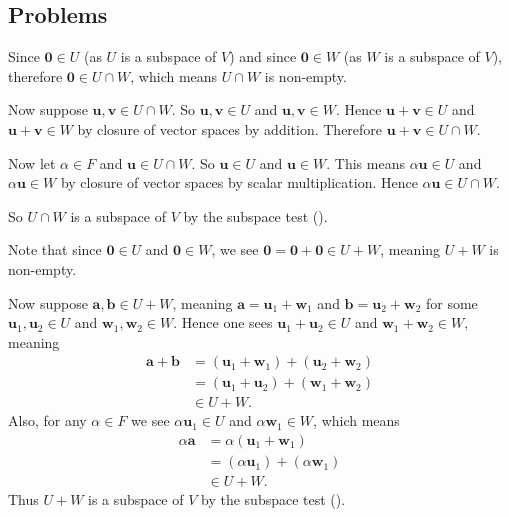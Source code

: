 \subsection*{Problems}
\begin{questions}
    \item \begin{partquestions}{\alph*}
        \item Since $\mathbf{0} \in U$ (as $U$ is a subspace of $V$) and since $\mathbf{0} \in W$ (as $W$ is a subspace of $V$), therefore $\mathbf{0} \in U \cap W$, which means $U \cap W$ is non-empty.

        Now suppose $\mathbf{u}, \mathbf{v} \in U \cap W$. So $\mathbf{u}, \mathbf{v} \in U$ and $\mathbf{u}, \mathbf{v} \in W$. Hence $\mathbf{u} + \mathbf{v} \in U$ and $\mathbf{u} + \mathbf{v} \in W$ by closure of vector spaces by addition. Therefore $\mathbf{u} + \mathbf{v} \in U \cap W$.

        Now let $\alpha \in F$ and $\mathbf{u} \in U \cap W$. So $\mathbf{u} \in U$ and $\mathbf{u} \in W$. This means $\alpha\mathbf{u} \in U$ and $\alpha\mathbf{u} \in W$ by closure of vector spaces by scalar multiplication. Hence $\alpha\mathbf{u} \in U \cap W$.

        So $U \cap W$ is a subspace of $V$ by the subspace test ().

        \item Note that since $\mathbf{0} \in U$ and $\mathbf{0} \in W$, we see $\mathbf{0} = \mathbf{0} + \mathbf{0} \in U + W$, meaning $U + W$ is non-empty.

        Now suppose $\mathbf{a}, \mathbf{b} \in U + W$, meaning $\mathbf{a} = \mathbf{u}_1 + \mathbf{w}_1$ and $\mathbf{b} = \mathbf{u}_2 + \mathbf{w}_2$ for some $\mathbf{u}_1, \mathbf{u}_2 \in U$ and $\mathbf{w}_1, \mathbf{w}_2 \in W$. Hence one sees $\mathbf{u}_1 + \mathbf{u}_2 \in U$ and $\mathbf{w}_1 + \mathbf{w}_2 \in W$, meaning
        \begin{align*}
            \mathbf{a} + \mathbf{b} &= (\mathbf{u}_1 + \mathbf{w}_1) + (\mathbf{u}_2 + \mathbf{w}_2)\\
            &= (\mathbf{u}_1 + \mathbf{u}_2) + (\mathbf{w}_1 + \mathbf{w}_2)\\
            &\in U + W.
        \end{align*}
        Also, for any $\alpha \in F$ we see $\alpha\mathbf{u}_1 \in U$ and $\alpha\mathbf{w}_1 \in W$, which means
        \begin{align*}
            \alpha\mathbf{a} &= \alpha(\mathbf{u}_1 + \mathbf{w}_1)\\
            &= (\alpha\mathbf{u}_1) + (\alpha\mathbf{w}_1)\\
            &\in U + W.
        \end{align*}
        Thus $U + W$ is a subspace of $V$ by the subspace test ().
    \end{partquestions}


\end{questions}
